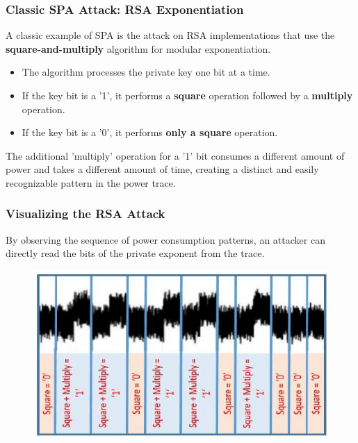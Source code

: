 \begin{frame}
    \frametitle{Classic SPA Attack: RSA Exponentiation}
    
    A classic example of SPA is the attack on RSA implementations that use the \textbf{square-and-multiply} algorithm for modular exponentiation.

    \begin{itemize}
        \item The algorithm processes the private key one bit at a time.
        \item If the key bit is a '1', it performs a \textbf{square} operation followed by a \textbf{multiply} operation.
        \item If the key bit is a '0', it performs \textbf{only a square} operation.
    \end{itemize}
    
    The additional 'multiply' operation for a '1' bit consumes a different amount of power and takes a different amount of time, creating a distinct and easily recognizable pattern in the power trace.
\end{frame}


\begin{frame}
    \frametitle{Visualizing the RSA Attack}
    
    By observing the sequence of power consumption patterns, an attacker can directly read the bits of the private exponent from the trace.

    \begin{figure}
        \centering
        \includegraphics[width=0.8\linewidth]{main thing/Pictures/rsa_exponent.png}
    \end{figure}

  
\end{frame}
